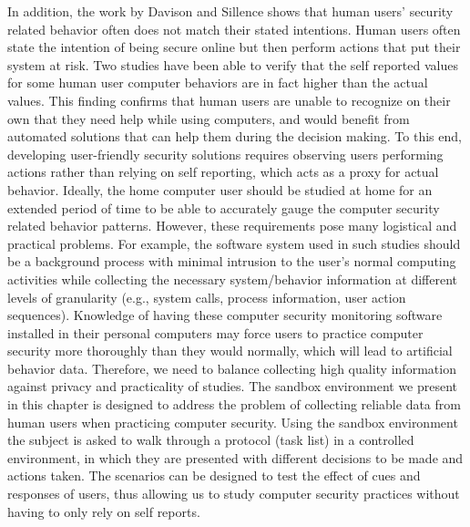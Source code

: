 In addition, the work by Davison and Sillence \citeyear{davinson2010} shows that human users' security related behavior often does not match their stated intentions. 
Human users often state the intention of being secure online but then perform actions that put their system at risk. 
Two studies \cite{govani2005, national2010} have been able to verify that the self reported values for some human user computer behaviors are in fact higher than the actual values.
This finding confirms that human users are unable to recognize  on their own that they need help while using computers, and would benefit from automated solutions that can help them during the decision making.
To this end, developing user-friendly security solutions requires observing users performing actions rather than relying on self reporting, which acts as a proxy for actual behavior. Ideally, the home computer user should be studied at home for an extended period of time to be able to accurately gauge the computer security related behavior patterns. 
However, these requirements pose many logistical and practical problems. 
For example, the software system used in such studies should be a background process with minimal intrusion to the user's normal computing activities while collecting the necessary system/behavior information at different levels of granularity (e.g., system calls, process information, user action sequences). 
Knowledge of having these computer security monitoring software installed in their personal computers may force users to practice computer security more thoroughly than they would normally, which will lead to artificial behavior data.  
Therefore, we need to balance collecting high quality information against privacy and practicality of studies. 
The sandbox environment  we present in this chapter is designed to address the problem of collecting reliable data from human users when practicing computer security. 
Using the sandbox environment the subject is asked to walk through a protocol (task list) in a controlled environment, in which they are presented with different decisions to be made and actions taken. 
The scenarios can be designed to test the effect of cues and responses of users, thus allowing us to study computer security practices without having to only rely on self reports. 



